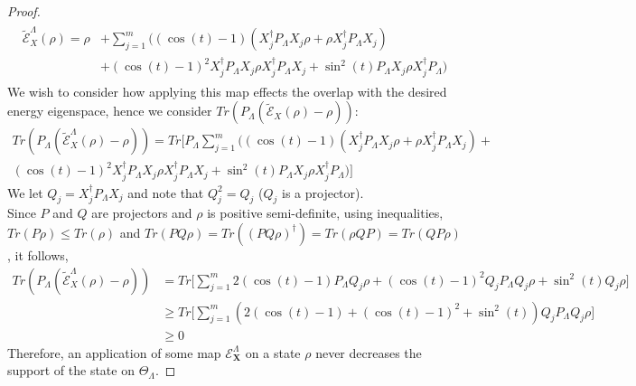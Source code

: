 \documentclass[10pt]{amsart}
\newcommand{\E}{\mathcal{E}}
\newcommand{\X}{\textbf{X}}
\begin{document}
\begin{proof}
    \begin{align}
    \begin{split}
                \tilde{\mathcal{E}}^{\Lambda}_{X}(\rho) = \rho &+ \sum_{j=1}^m \bigg( (\cos (t) -1) (X_j^{\dagger}P_{\Lambda} X_j \rho + \rho X_j^{\dagger}P_{\Lambda} X_j)  \\&+ (\cos (t) -1)^2 X_j^{\dagger}P_{\Lambda} X_j \rho X_j^{\dagger}P_{\Lambda} X_j + \sin^2(t) P_{\Lambda}X_j\rho X_j^{\dagger} P_{\Lambda}\bigg)
                    \end{split}
    \end{align}
    We wish to consider how applying this map effects the overlap with the desired energy eigenspace, hence we consider $Tr(P_{\Lambda} (\tilde{\mathcal{E}}_{X}(\rho) -\rho))$:
    \begin{multline}
        Tr(P_{\Lambda} (\tilde{\mathcal{E}}^{\Lambda}_{X}(\rho) -\rho)) = Tr\bigg[P_{\Lambda} \sum_{j=1}^m \bigg( (\cos (t) -1) (X_j^{\dagger}P_{\Lambda} X_j \rho +  \rho X_j^{\dagger}P_{\Lambda} X_j) + \\ (\cos (t) -1)^2 X_j^{\dagger}P_{\Lambda} X_j \rho X_j^{\dagger}P_{\Lambda} X_j + \sin^2(t) P_{\Lambda}X_j\rho X_j^{\dagger} P_{\Lambda}\bigg)\bigg]
    \end{multline}
    We let $Q_j = X_j^{\dagger}P_{\Lambda} X_j$ and note that $Q_j^2 = Q_j$ ($Q_j$ is a projector).\\ Since $P$ and $Q$ are projectors and $\rho$ is positive semi-definite, using inequalities, $Tr(P\rho) \leq Tr(\rho)$ and $Tr(PQ\rho) = Tr((PQ\rho)^{\dagger}) = Tr(\rho QP) = Tr(QP\rho)$, it follows,
    \begin{align}
    \label{eq_P0tracegeq0} 
        Tr(P_{\Lambda} (\tilde{\mathcal{E}}^{\Lambda}_{X}(\rho) -\rho)) &= Tr\bigg[ \sum_{j=1}^m  2(\cos (t) -1) P_{\Lambda}Q_j \rho + (\cos (t) -1)^2 Q_jP_{\Lambda}Q_j \rho  + \sin^2(t) Q_j\rho  \bigg]  \\
        & \geq Tr\bigg[ \sum_{j=1}^m  \left(2(\cos (t) -1)+(\cos (t) -1)^2 + \sin^2(t)\right) Q_jP_{\Lambda}Q_j \rho  \bigg] \nonumber \\
        & \geq 0  \nonumber 
    \end{align}
Therefore, an application of some map $\E_\X^{\Lambda}$ on a state $\rho$ never decreases the support of the state on $\Theta_\Lambda$.



\end{proof}
\end{document}

